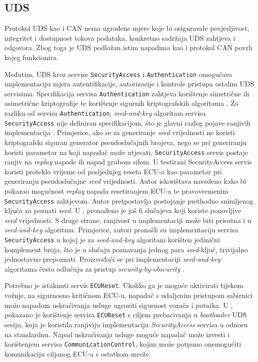 \documentclass[times, utf8, diplomski, numeric]{fer}
\begin{document}
\subsection{UDS}
Protokol UDS kao i CAN nema ugrađene mjere koje bi osiguravale povjerljivost, integritet i dostupnost tokova podataka, konkretno sadržaja UDS zahtjeva i odgovora. Zbog toga je UDS podložan istim napadima kao i protokol CAN povrh kojeg funkcionira. 

Međutim, UDS kroz servise \texttt{SecurityAccess} i \texttt{Authentication} omogućava implementaciju mjera autentifikacije, autorizacije i kontrole pristupa ostalim UDS servisima. Specifikacija servisa \texttt{Authentication} zahtjeva korištenje simetrične ili asimetrične kriptografije te korištenje sigurnih kriptografskih algoritama \cite{vector2021uds}. Za razliku od servisa \texttt{Authentication}, \textit{seed-and-key} algoritam servisa \texttt{SecurityAccess} nije definiran specifikacijom, što je glavni razlog pojave ranjivih implementacija \cite{sermpinis2022uds, lauser2023formal}. Primjerice, ako se za generiranje \textit{seed} vrijednosti ne koristi kriptografski siguran generator pseudoslučajnih brojeva, nego se pri generiranju koristi parametar na koji napadač može utjecati, \texttt{SecurityAccess} servis postaje ranjiv na \textit{replay} napade ili napad grubom silom. U \cite{sermpinis2022uds} testirani SecurityAccess servis koristi proteklo vrijeme od posljednjeg reseta ECU-a kao parametar pri generiranju pseudoslučajne \textit{seed} vrijednosti. Autor iskorištava navedeno kako bi pokazao mogućnost \textit{replay} napada resetiranjem ECU-a te pravovremenim \texttt{SecurityAccess} zahtjevom. Autor pretpostavlja postojanje prethodno snimljenog ključa za poznati \textit{seed}. U \cite{ring2014evaluation}, pronađeno je još 6 slučajeva koji koriste ponovljive \textit{seed} vrijednosti. S druge strane, ranjivost u implementaciji može biti prisutna i u \textit{seed-and-key} algoritmu. Primjerice, autori \cite{durrwang2017security} pronašli su implementaciju servisa \texttt{SecurityAccess} u kojoj je za \textit{seed-and-key} algoritam korišten jedinični komplement broja, što je u slučaju poznavanja jednog para \textit{seed}-ključ, trivijalno jednostavno prepoznati. Proizvođači se pri implementaciji \textit{seed-and-key} algoritama često odlučuju za pristup \textit{security-by-obscurity} \cite{durrwang2017security, ring2014evaluation, sermpinis2022uds}.

Potrebno je istaknuti servis \texttt{ECUReset}. Ukoliko ga je moguće aktivirati tijekom vožnje, na sigurnosno kritičnom ECU-u, napadač s udaljenim pristupom sabirnici može napadom uskraćivanja usluge ugroziti sigurnost vozača i putnika. U \cite{sermpinis2022automotive}, pokazano je korištenje servisa \texttt{ECUReset} s ciljem prebacivanja u \textit{bootloader} UDS sesiju, koja je koristila ranjiviju implementaciju \textit{SecurityAccess} servisa u odnosu na standardnu. Napad uskraćivanja usluge moguće napadač može izvesti i korištenjem servisa \texttt{CommunicationControl}, kojim može potpuno onemogućiti komunikaciju ciljanog ECU-a s ostatkom mreže. 
\end{document}
